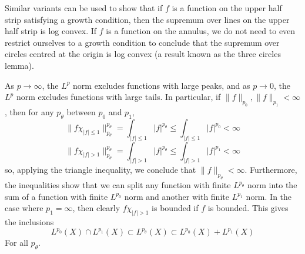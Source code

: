 \begin{remark}
	Similar variants can be used to show that if $f$ is a function on the upper half strip satisfying a growth condition, then the supremum over lines on the upper half strip is log convex. If $f$ is a function on the annulus, we do not need to even restrict ourselves to a growth condition to conclude that the supremum over circles centred at the origin is log convex (a result known as the three circles lemma).
\end{remark}



As $p \to \infty$, the $L^p$ norm excludes functions with large peaks, and as $p \to 0$, the $L^p$ norm excludes functions with large tails. In particular, if $\| f \|_{p_0}, \| f \|_{p_1} < \infty$, then for any $p_\theta$ between $p_0$ and $p_1$,
%
\[ \| f \chi_{|f| \leq 1} \|_{p_\theta}^{p_\theta} = \int_{|f| \leq 1} |f|^{p_\theta} \leq \int_{|f| \leq 1} |f|^{p_0} < \infty \]
\[ \| f \chi_{|f| > 1} \|_{p_\theta}^{p_\theta} = \int_{|f| > 1} |f|^{p_\theta} \leq \int_{|f| > 1} |f|^{p_1} < \infty \]
%
so, applying the triangle inequality, we conclude that $\| f \|_{p_\theta} < \infty$. Furthermore, the inequalities show that we can split any function with finite $L^{p_\theta}$ norm into the sum of a function with finite $L^{p_0}$ norm and another with finite $L^{p_1}$ norm. In the case where $p_1 = \infty$, then clearly $f \chi_{|f| > 1}$ is bounded if $f$ is bounded. This gives the inclusions
%
\[ L^{p_0}(X) \cap L^{p_1}(X) \subset L^{p_\theta}(X) \subset L^{p_0}(X) + L^{p_1}(X) \]
%
For all $p_\theta$.

